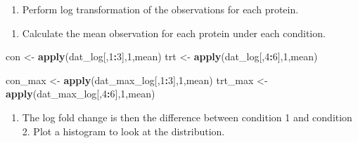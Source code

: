 \documentclass[12pt,]{book}
\newenvironment{Shaded}{\begin{snugshade}}{\end{snugshade}}
\newcommand{\KeywordTok}[1]{\textcolor[rgb]{0.13,0.29,0.53}{\textbf{#1}}}
\newcommand{\DecValTok}[1]{\textcolor[rgb]{0.00,0.00,0.81}{#1}}
\newcommand{\StringTok}[1]{\textcolor[rgb]{0.31,0.60,0.02}{#1}}
\newcommand{\CommentTok}[1]{\textcolor[rgb]{0.56,0.35,0.01}{\textit{#1}}}
\newcommand{\OperatorTok}[1]{\textcolor[rgb]{0.81,0.36,0.00}{\textbf{#1}}}
\newcommand{\NormalTok}[1]{#1}
\providecommand{\tightlist}{%
  \setlength{\itemsep}{0pt}\setlength{\parskip}{0pt}}
\theoremstyle{definition}
\theoremstyle{definition}
\theoremstyle{definition}
\theoremstyle{remark}
\begin{document}
\begin{enumerate}
\def\labelenumi{\arabic{enumi}.}
\setcounter{enumi}{3}
\tightlist
\item
  Perform log transformation of the observations for each protein.
\end{enumerate}

\begin{Shaded}
\end{Shaded}

\begin{enumerate}
\def\labelenumi{\arabic{enumi}.}
\setcounter{enumi}{4}
\tightlist
\item
  Calculate the mean observation for each protein under each condition.
\end{enumerate}

\begin{Shaded}
\begin{Highlighting}[]
\NormalTok{con <-}\StringTok{ }\KeywordTok{apply}\NormalTok{(dat_log[,}\DecValTok{1}\OperatorTok{:}\DecValTok{3}\NormalTok{],}\DecValTok{1}\NormalTok{,mean)}
\NormalTok{trt <-}\StringTok{ }\KeywordTok{apply}\NormalTok{(dat_log[,}\DecValTok{4}\OperatorTok{:}\DecValTok{6}\NormalTok{],}\DecValTok{1}\NormalTok{,mean)}

\NormalTok{con_max <-}\StringTok{ }\KeywordTok{apply}\NormalTok{(dat_max_log[,}\DecValTok{1}\OperatorTok{:}\DecValTok{3}\NormalTok{],}\DecValTok{1}\NormalTok{,mean)}
\NormalTok{trt_max <-}\StringTok{ }\KeywordTok{apply}\NormalTok{(dat_max_log[,}\DecValTok{4}\OperatorTok{:}\DecValTok{6}\NormalTok{],}\DecValTok{1}\NormalTok{,mean)}
\end{Highlighting}
\end{Shaded}

\begin{enumerate}
\def\labelenumi{\arabic{enumi}.}
\setcounter{enumi}{5}
\tightlist
\item
  The log fold change is then the difference between condition 1 and
  condition 2. Plot a histogram to look at the distribution.
\end{enumerate}
\end{document}
